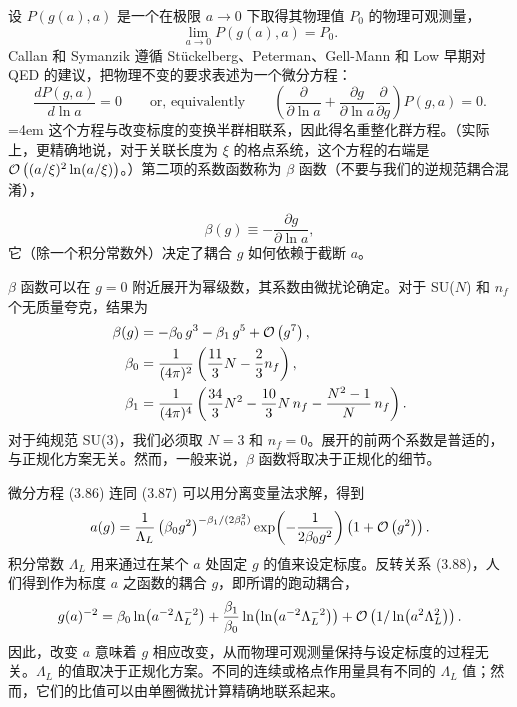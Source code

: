 设 $P(g(a), a)$ 是一个在极限 $a \to 0$ 下取得其物理值 $P_0$ 的物理可观测量，
\begin{equation}
  \lim_{a\to 0} P(g(a), a) = P_0 .
\end{equation}
Callan 和 Symanzik 遵循 St\"uckelberg、Peterman、Gell-Mann 和 Low 早期对 QED 的建议，把物理不变的要求表述为一个微分方程：
\begin{equation}
  \frac{dP(g, a)}{d\ln a} = 0 \qquad \text{or, equivalently} \qquad
  \left(\frac{\partial}{\partial\ln a} + \frac{\partial g}{\partial\ln a}
    \frac{\partial}{\partial g}\right) P(g, a) = 0 .
\end{equation}
\begingroup\emergencystretch=4em 这个方程与改变标度的变换半群相联系，因此得名重整化群方程。（实际上，更精确地说，对于关联长度为 $\xi$ 的格点系统，这个方程的右端是\linebreak[0] $\mathcal{O}\left((a/\xi)^2 \ln(a/\xi)\right)$。）第二项的系数函数称为 $\beta$ 函数（不要与我们的逆规范耦合混淆），\par\endgroup
\begin{equation}
  \beta(g) \equiv -\frac{\partial g}{\partial\ln a} ,
\end{equation}
它（除一个积分常数外）决定了耦合 $g$ 如何依赖于截断 $a$。

$\beta$ 函数可以在 $g = 0$ 附近展开为幂级数，其系数由微扰论确定。对于 SU($N$) 和 $n_f$ 个无质量夸克，结果为
\begin{equation}
\begin{aligned}
  \beta(g) &= -\beta_0\,g^3 - \beta_1\,g^5 + \mathcal{O}\left(g^7\right) ,\\
  \beta_0 &= \frac{1}{(4\pi)^2}\left(\frac{11}{3}N - \frac{2}{3}n_f\right) ,\\
  \beta_1 &= \frac{1}{(4\pi)^4}\left(\frac{34}{3}N^2 - \frac{10}{3}N\,n_f
    - \frac{N^2 - 1}{N}\,n_f\right) .
\end{aligned}
\end{equation}
对于纯规范 SU(3)，我们必须取 $N = 3$ 和 $n_f = 0$。展开的前两个系数是普适的，与正规化方案无关。然而，一般来说，$\beta$ 函数将取决于正规化的细节。

微分方程 (3.86) 连同 (3.87) 可以用分离变量法求解，得到
\begin{equation}
  a(g) = \frac{1}{\Lambda_L}\left(\beta_0 g^2\right)^{-\beta_1/(2\beta_0^2)}
    \exp\!\left(-\frac{1}{2\beta_0 g^2}\right)\left(1 + \mathcal{O}\left(g^2\right)\right) .
\end{equation}
积分常数 $\Lambda_L$ 用来通过在某个 $a$ 处固定 $g$ 的值来设定标度。反转关系 (3.88)，人们得到作为标度 $a$ 之函数的耦合 $g$，即所谓的跑动耦合，
\begin{equation}
  g(a)^{-2} = \beta_0 \ln\!\left(a^{-2}\Lambda_L^{-2}\right)
  + \frac{\beta_1}{\beta_0}\ln\!\left(\ln\!\left(a^{-2}\Lambda_L^{-2}\right)\right)
  + \mathcal{O}\left(1/\ln\!\left(a^2 \Lambda_L^2\right)\right) .
\end{equation}
因此，改变 $a$ 意味着 $g$ 相应改变，从而物理可观测量保持与设定标度的过程无关。$\Lambda_L$ 的值取决于正规化方案。不同的连续或格点作用量具有不同的 $\Lambda_L$ 值；然而，它们的比值可以由单圈微扰计算精确地联系起来。

